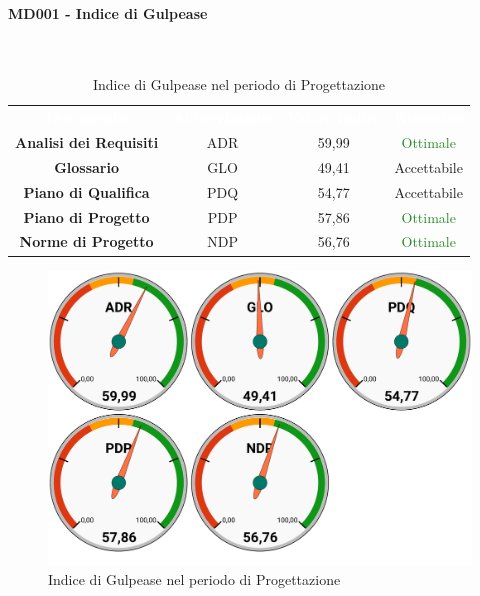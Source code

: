 \paragraph{MD001 - Indice di Gulpease}\mbox{}\\[0,3cm]
\begin{table}[H]
	\centering
	\begin{tabular}{cccc}
	\rowcolor{greySWEight}
	\textcolor{white}{\textbf{Documento}} & 
	\textcolor{white}{\textbf{Abbreviazione}} &
	\textcolor{white}{\textbf{Valore Indice}}&
	\textcolor{white}{\textbf{Riscontro}}\\
	
	\textbf{Analisi dei Requisiti} & ADR & 59,99 & \textcolor{ForestGreen}{Ottimale} \\
	\textbf{Glossario} & GLO & 49,41 & \textcolor{YellowOrange}{Accettabile} \\
	\textbf{Piano di Qualifica} & PDQ & 54,77 & \textcolor{YellowOrange}{Accettabile} \\
	\textbf{Piano di Progetto} & PDP & 57,86 & \textcolor{ForestGreen}{Ottimale} \\
	\textbf{Norme di Progetto} & NDP & 56,76 & \textcolor{ForestGreen}{Ottimale} \\

	\end{tabular}
	\caption{Indice di Gulpease nel periodo di Progettazione}
\end{table}
\begin{figure}[H]
	\includegraphics[width=1\linewidth]{sez/App_Esito/Progettazione/graph/PR_Gulp.pdf}
	\caption{Indice di Gulpease nel periodo di Progettazione}
\end{figure}

